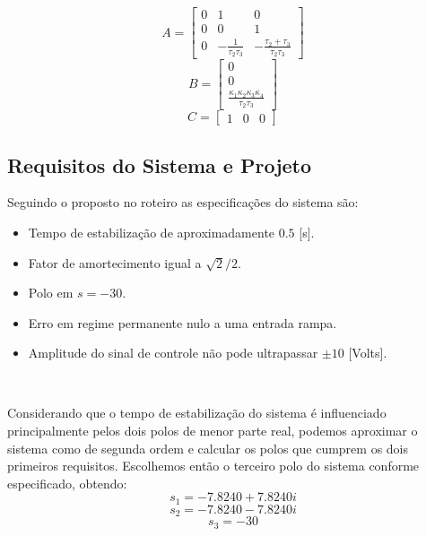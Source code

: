 \documentclass{article}
\begin{document}
\begin{equation}
\label{eq:mata}
A=
\begin{bmatrix}
 0 & 1 & 0 \\
 0 & 0 & 1 \\
 0 & -\frac{1}{\tau_2\tau_3} & -\frac{\tau_2+\tau_3}{\tau_2\tau_3}
\end{bmatrix}
\end{equation}
\begin{equation}
\label{eq:matb}
B=
\begin{bmatrix}
0 \\
0 \\
\frac{\kappa_1\kappa_2\kappa_3\kappa_4}{\tau_2\tau_3}
\end{bmatrix}
\end{equation}
\begin{equation}
\label{eq:matc}
C=
\begin{bmatrix}
1 & 0 & 0
\end{bmatrix}
\end{equation}

\subsection{Requisitos do Sistema e Projeto}
Seguindo o proposto no roteiro \cite{bb:roteiro} as especificações do sistema são:
\begin{itemize}
	\item Tempo de estabilização de aproximadamente $0.5$ [s].
	\item Fator de amortecimento igual a $\sqrt{2}/2$.
	\item Polo em $s=-30$.
	\item Erro em regime permanente nulo a uma entrada rampa.
	\item Amplitude do sinal de controle não pode ultrapassar $\pm10$ [Volts].
\end{itemize}\

Considerando que o tempo de estabilização do sistema é influenciado principalmente pelos dois polos de menor parte real, podemos aproximar o sistema como de segunda ordem e calcular os polos que cumprem os dois primeiros requisitos. Escolhemos então o terceiro polo do sistema conforme especificado, obtendo:
\begin{equation}
	s_1=-7.8240 + 7.8240i
\end{equation}
\begin{equation}
	s_2=-7.8240 - 7.8240i
\end{equation}
\begin{equation}
	s_3=-30
\end{equation}
\end{document}
